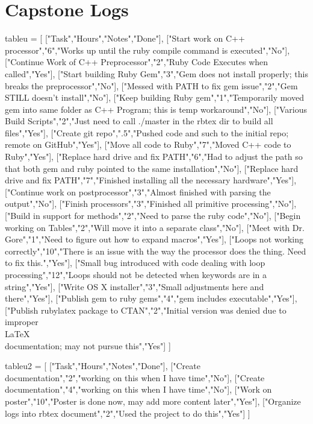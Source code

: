 \documentclass{hw}
\begin{document}
\section*{Capstone Logs}
\begin{rbtex}
tableu = [
    ["Task","Hours","Notes","Done"],
    ["Start work on C++ processor","6","Works up until the ruby compile command is executed","No"],
    ["Continue Work of C++ Preprocessor","2","Ruby Code Executes when called","Yes"],
    ["Start building Ruby Gem","3","Gem does not install properly; this breaks the preprocessor","No"],
    ["Messed with PATH to fix gem issue","2","Gem STILL doesn't install","No"],
    ["Keep building Ruby gem","1","Temporarily moved gem into same folder as C++ Program; this is temp workaround","No"],
    ["Various Build Scripts","2","Just need to call ./master in the rbtex dir to build all files","Yes"],
    ["Create git repo",".5","Pushed code and such to the initial repo; remote on GitHub","Yes"],
    ["Move all code to Ruby","7","Moved C++ code to Ruby","Yes"],
    ["Replace hard drive and fix PATH","6","Had to adjust the path so that both gem and ruby pointed to the same installation","No"],
    ["Replace hard drive and fix PATH","7","Finished installing all the necessary hardware","Yes"],
    ["Continue work on postprocessor","3","Almost finished with parsing the output","No"],
    ["Finish processors","3","Finished all primitive processing","No"],
    ["Build in support for methods","2","Need to parse the ruby code","No"],
    ["Begin working on Tables","2","Will move it into a separate class","No"],
    ["Meet with Dr. Gore","1","Need to figure out how to expand macros","Yes"],
    ["Loops not working correctly","10","There is an issue with the way the processor does the thing. Need to fix this.","Yes"],
    ["Small bug introduced with code dealing with loop processing","12","Loops should not be detected when keywords are in a string","Yes"],
    ["Write OS X installer","3","Small adjustments here and there","Yes"],
    ["Publish gem to ruby gems","4","gem includes executable","Yes"],
    ["Publish rubylatex package to CTAN","2","Initial version was denied due to improper \\LaTeX\\ documentation; may not pursue this","Yes"]
]

tableu2 = [
    ["Task","Hours","Notes","Done"],
    ["Create documentation","2","working on this when I have time","No"],
    ["Create documentation","4","working on this when I have time","No"],
    ["Work on poster","10","Poster is done now, may add more content later","Yes"],
    ["Organize logs into rbtex document","2","Used the project to do this","Yes"]
]


\end{rbtex}
\end{document}
